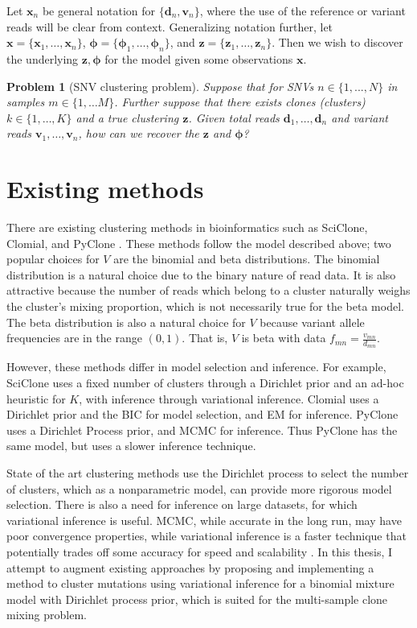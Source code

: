 \documentclass[11pt]{article}
\newcommand{\bx}{\ensuremath{\mathbf{x}}}
\newcommand{\bz}{\ensuremath{\mathbf{z}}}
\newcommand{\bphi}{\ensuremath{\bm{\phi}}}
\newtheorem*{problem*}{Problem}
\begin{document}
Let $\bx_{n}$ be general notation for $\{\bm{d}_{n}, \bm{v}_{n}\}$, where the use of the reference or variant reads will be clear from context. Generalizing notation further, let $\bx = \{\bx_1, \ldots, \bx_n\}$, $\bphi = \{\bphi_1, \ldots, \bphi_n\}$, and $\bz = \{\bz_1, \ldots, \bz_n\}$. Then we wish to discover the underlying $\bz, \bphi$ for the model given some observations $\bx$.

\begin{problem*}[SNV clustering problem]
Suppose that for SNVs $n \in \{1, ..., N\}$ in samples $m\in\{1, \ldots M\}$. Further suppose that there exists clones (clusters) $k\in\{1,\ldots,K\}$ and a true clustering $\bz$. Given total reads $\bm{d}_1, \ldots, \bm{d}_n$ and variant reads $\bm{v}_1, \ldots, \bm{v}_n$, how can we recover the $\bm{z}$ and $\bphi$?
\end{problem*}

\section{Existing methods}

There are existing clustering methods in bioinformatics such as SciClone, Clomial, and PyClone \cite{SciClone, Clomial, PyClone}. These methods follow the model described above; two popular choices for $V$ are the binomial and beta distributions. The binomial distribution is a natural choice due to the binary nature of read data. It is also attractive because the number of reads which belong to a cluster naturally weighs the cluster's mixing proportion, which is not necessarily true for the beta model. The beta distribution is also a natural choice for $V$ because variant allele frequencies are in the range $(0,1)$. That is, $V$ is beta with data $f_{mn} = \frac{v_{mn}}{d_{mn}}$. 

However, these methods differ in model selection and inference. For example, SciClone uses a fixed number of clusters through a Dirichlet prior and an ad-hoc heuristic for $K$, with inference through variational inference. Clomial uses a Dirichlet prior and the BIC for model selection, and EM for inference. PyClone uses a Dirichlet Process prior, and MCMC for inference. Thus PyClone has the same model, but uses a slower inference technique.

State of the art clustering methods use the Dirichlet process to select the number of clusters, which as a nonparametric model, can provide more rigorous model selection. There is also a need for inference on large datasets, for which variational inference is useful. MCMC, while accurate in the long run, may have poor convergence properties, while variational inference is a faster technique that potentially trades off some accuracy for speed and scalability \cite{Jordan1999}. In this thesis, I attempt to augment existing approaches by proposing and implementing a method to cluster mutations using variational inference for a binomial mixture model with Dirichlet process prior, which is suited for the multi-sample clone mixing problem.
\end{document}
